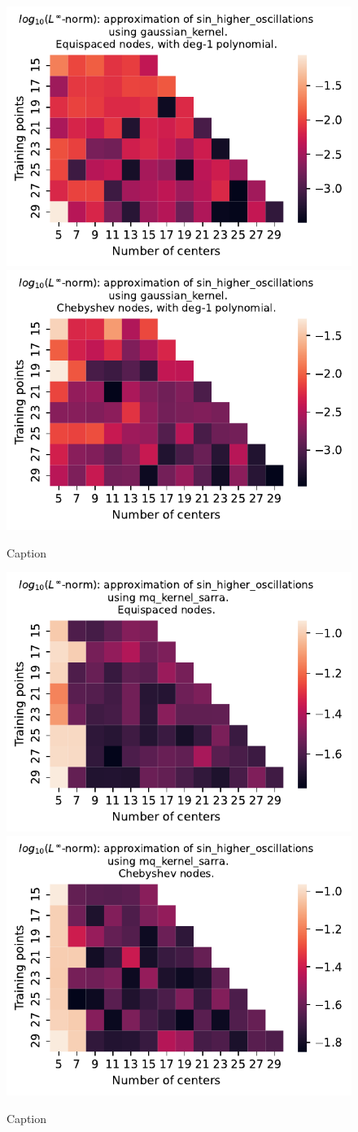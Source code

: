 \documentclass[12pt]{report} %
\begin{document}
\begin{figure}[ht]
    \centering
    
    \includegraphics[width=.49\textwidth]{imagenes/experiments/1d/variational/sin_higher_oscillations-Kgaussian_kernel-Poly-Equi.pdf}
    \includegraphics[width=.49\textwidth]{imagenes/experiments/1d/variational/sin_higher_oscillations-Kgaussian_kernel-Poly-Cheb.pdf}
    \caption{Caption}
    \label{fig:sin-higher-oscillations-gaussian-poly}
\end{figure}

\begin{figure}[ht]
    \centering
    
    \includegraphics[width=.49\textwidth]{imagenes/experiments/1d/variational/sin_higher_oscillations-Kmq_kernel_sarra-Equi.pdf}
    \includegraphics[width=.49\textwidth]{imagenes/experiments/1d/variational/sin_higher_oscillations-Kmq_kernel_sarra-Cheb.pdf}
    \caption{Caption}
    \label{fig:sin-higher-oscillations-sarra}
\end{figure}
\end{document}
